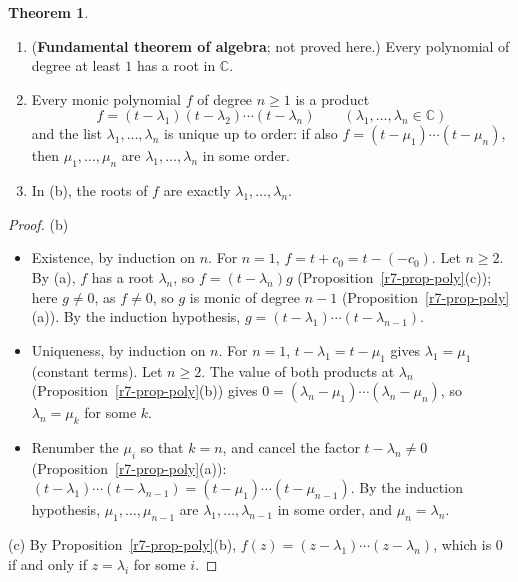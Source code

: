 \documentclass[12pt]{article}
\theoremstyle{definition}
\newtheorem{theorem}{Theorem}
\begin{document}
\begin{theorem}\label{r7-thm-factor}
\begin{enumerate}
\item (\textbf{Fundamental theorem of algebra}; not proved here.) Every polynomial of degree at least \(1\) has a root
in \(\mathbb C\).
\item Every monic polynomial \(f\) of degree \(n\geqslant1\) is a product
\[
f=(t-\lambda_1)(t-\lambda_2)\cdots(t-\lambda_n)\qquad(\lambda_1,\dots,\lambda_n\in\mathbb C)
\]
and the list \(\lambda_1,\dots,\lambda_n\) is unique up to order: if also \(f=(t-\mu_1)\cdots(t-\mu_n)\), then
\(\mu_1,\dots,\mu_n\) are \(\lambda_1,\dots,\lambda_n\) in some order.
\item In (b), the roots of \(f\) are exactly \(\lambda_1,\dots,\lambda_n\).
\end{enumerate}
\end{theorem}
\begin{proof}
(b)
\begin{itemize}
\item Existence, by induction on \(n\). For \(n=1\), \(f=t+c_0=t-(-c_0)\). Let \(n\geqslant2\). By (a), \(f\) has a root
\(\lambda_n\), so \(f=(t-\lambda_n)g\) (Proposition~\ref{r7-prop-poly}(c)); here \(g\ne0\), as \(f\ne0\), so \(g\) is monic of
degree \(n-1\) (Proposition~\ref{r7-prop-poly}(a)). By the induction hypothesis, \(g=(t-\lambda_1)\cdots(t-\lambda_{n-1})\).
\item Uniqueness, by induction on \(n\). For \(n=1\), \(t-\lambda_1=t-\mu_1\) gives \(\lambda_1=\mu_1\) (constant terms).
Let \(n\geqslant2\). The value of both products at \(\lambda_n\) (Proposition~\ref{r7-prop-poly}(b)) gives
\(0=(\lambda_n-\mu_1)\cdots(\lambda_n-\mu_n)\), so \(\lambda_n=\mu_k\) for some \(k\).
\item Renumber the \(\mu_i\) so that \(k=n\), and cancel the factor \(t-\lambda_n\ne0\) (Proposition~\ref{r7-prop-poly}(a)):
\((t-\lambda_1)\cdots(t-\lambda_{n-1})=(t-\mu_1)\cdots(t-\mu_{n-1})\). By the induction hypothesis,
\(\mu_1,\dots,\mu_{n-1}\) are \(\lambda_1,\dots,\lambda_{n-1}\) in some order, and \(\mu_n=\lambda_n\).
\end{itemize}
(c) By Proposition~\ref{r7-prop-poly}(b), \(f(z)=(z-\lambda_1)\cdots(z-\lambda_n)\), which is \(0\) if and only if
\(z=\lambda_i\) for some \(i\).
\end{proof}
\end{document}
